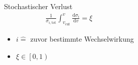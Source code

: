 \documentclass[aspectratio=1610, captions=tableheading, 11pt]{beamer}
\begin{document}
\begin{frame}[fragile]
\begin{columns}
\begin{overprint}
      { 
        \centering
        \begin{block}{Stochastischer Verlust}
          \begin{align*}
              \frac{1}{\sigma_{i, \text{tot}}} \int_{v_\text{cut}}^v \frac{\mathrm{d}\sigma_i}{\mathrm{d}v} = \xi
          \end{align*}
        \end{block}
        \begin{itemize}
            \item $i \hat{=}$ zuvor bestimmte Wechselwirkung \\[0.25cm]
            \item $\xi \in \left[0, 1 \right)$
        \end{itemize}
      }
  \end{overprint}
  \end{columns}
\end{frame}
\end{document}
